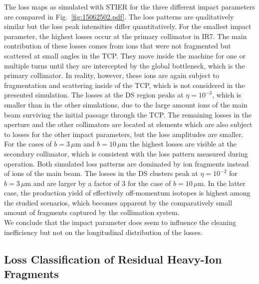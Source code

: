 The loss maps as simulated with STIER for the three different impact parameters are compared in Fig.~\ref{fig:15062502.pdf}. The loss patterns are qualitatively similar but the loss peak intensities differ quantitatively. For the smallest impact parameter, the highest losses occur at the primary collimator in IR7. The main contribution of these losses comes from \lead ions that were not fragmented but scattered at small angles in the TCP. They move inside the machine for one or multiple turns until they are intercepted by the global bottleneck, which is the primary collimator. In reality, however, these ions are again subject to fragmentation and scattering inside of the TCP, which is not considered in the presented simulation. The losses at the DS region peaks at $\eta=10^{-3}$, which is smaller than in the other simulations, due to the large amount ions of the main beam surviving the initial passage through the TCP. The remaining losses in the aperture and the other collimators are located at elements which are also subject to losses for the other impact parameters, but the loss amplitudes are smaller. For the cases of $b=3\,\mu$m and $b=10\,\mu$m the highest losses are visible at the secondary collimator, which is consistent with the loss pattern measured during operation. Both simulated loss patterns are dominated by ion fragments instead of ions of the main beam. The losses in the DS clusters peak at $\eta=10^{-2}$ for $b=3\,\mu$m and are larger by a factor of 3 for the case of $b=10\,\mu$m. In the latter case, the production yield of effectively off-momentum isotopes is highest among the studied scenarios, which becomes apparent by the comparatively small amount of fragments captured by the collimation system.
\\
We conclude that the impact parameter does seem to influence the cleaning inefficiency but not on the longitudinal distribution of the losses. 








\subsection{Loss Classification of Residual Heavy-Ion Fragments}

